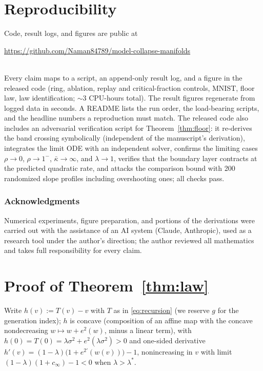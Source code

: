 \documentclass[11pt]{article}
\theoremstyle{remark}
\newcommand{\kb}{\bar\kappa}
\newcommand{\sigsq}{\sigma^2}
\begin{document}
\section{Reproducibility}\label{sec:repro}

Code, result logs, and figures are public at\\
\centerline{\url{https://github.com/Naman84789/model-collapse-manifolds}}\\
Every claim maps to a script, an append-only result log, and a figure in the released
code (ring, ablation, replay and critical-fraction controls, MNIST, floor law, law
identification; $\sim$3 CPU-hours total).
The result figures regenerate from logged data in seconds. A README lists the
run order, the load-bearing scripts, and the headline numbers a reproduction
must match. The released code also includes an adversarial verification script for
Theorem~\ref{thm:floor}: it re-derives the band crossing symbolically (independent of the
manuscript's derivation), integrates the limit ODE with an independent solver, confirms
the limiting cases $\rho\to0$, $\rho\to1^-$, $\kb\to\infty$, and $\lambda\to1$, verifies
that the boundary layer contracts at the predicted quadratic rate, and attacks the
comparison bound with 200 randomized slope profiles including overshooting ones; all
checks pass.

\subsubsection*{Acknowledgments}
Numerical experiments, figure preparation, and portions of the derivations were carried
out with the assistance of an AI system (Claude, Anthropic), used as a research tool
under the author's direction; the author reviewed all mathematics and takes full
responsibility for every claim.




\clearpage
\appendix

\section{Proof of Theorem~\ref{thm:law}}\label{app:law}

Write $h(v):=T(v)-v$ with $T$ as in \eqref{eq:recursion} (we reserve $g$ for the
generation index); $h$ is concave (composition of
an affine map with the concave nondecreasing $w\mapsto w+e^2(w)$, minus a linear term),
with $h(0)=T(0)=\lambda\sigsq+e^2(\lambda\sigsq)>0$ and one-sided derivative
$h'(v)=(1-\lambda)\big(1+e^{2\prime}(w(v))\big)-1$, nonincreasing in $v$ with limit
$(1-\lambda)(1+c_\infty)-1<0$ when $\lambda>\lambda^*$.
\end{document}
